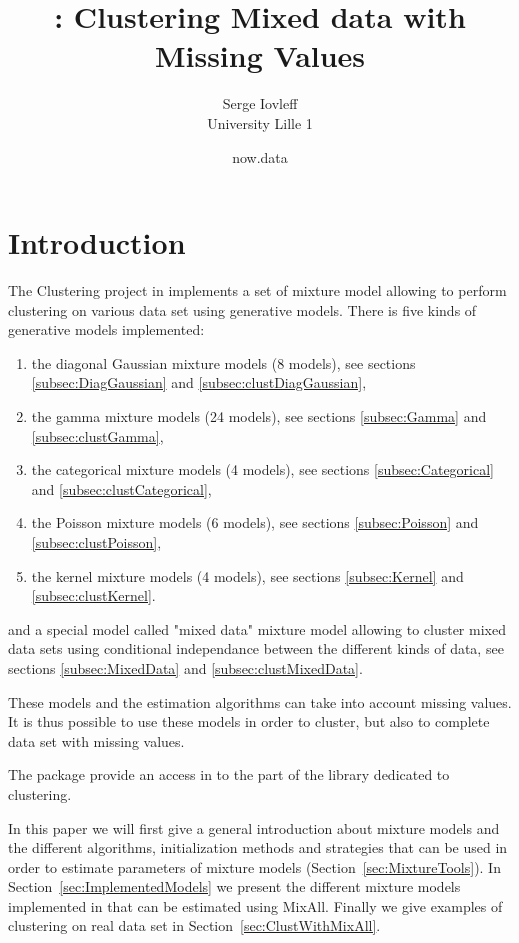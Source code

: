 \documentclass[shortnames,nojss,article]{jss}
\title{\pkg{MixAll}: Clustering Mixed data with Missing Values}
\author{Serge Iovleff\\University Lille 1}
\date{now.data}
\begin{document}
\maketitle


\section{Introduction}
The Clustering project in  implements a set of mixture model
allowing to perform clustering on various data set using generative models.
There is five kinds of generative models implemented:
\begin{enumerate}
  \item the diagonal Gaussian mixture models (8 models), see sections
  \ref{subsec:DiagGaussian} and \ref{subsec:clustDiagGaussian},
  \item the gamma mixture models (24 models), see sections
  \ref{subsec:Gamma} and \ref{subsec:clustGamma},
  \item the categorical mixture models (4 models), see sections
  \ref{subsec:Categorical} and \ref{subsec:clustCategorical},
  \item the Poisson mixture models (6 models), see sections
  \ref{subsec:Poisson} and \ref{subsec:clustPoisson},
  \item the kernel mixture models (4 models), see sections
  \ref{subsec:Kernel} and \ref{subsec:clustKernel}.
\end{enumerate}
and a special model called "mixed data" mixture model allowing to cluster
mixed data sets using conditional independance between the different
kinds of data, see sections \ref{subsec:MixedData} and
\ref{subsec:clustMixedData}.

These models and the estimation algorithms can take into account missing
values. It is thus possible to use these models in order to cluster, but
also to complete data set with missing values.

The  package provide an access in \citep{R:Main} to the
 \citep*{stk++}  part of the library dedicated to
clustering.

In this paper we will first give a general introduction about mixture models and
the different algorithms, initialization methods and strategies that can be used
in order to estimate parameters of mixture models
(Section~\ref{sec:MixtureTools}). In Section~\ref{sec:ImplementedModels} we
present the different mixture models implemented in  that can
be estimated using MixAll. Finally we give examples of clustering on real data
set in Section~\ref{sec:ClustWithMixAll}.
\end{document}
